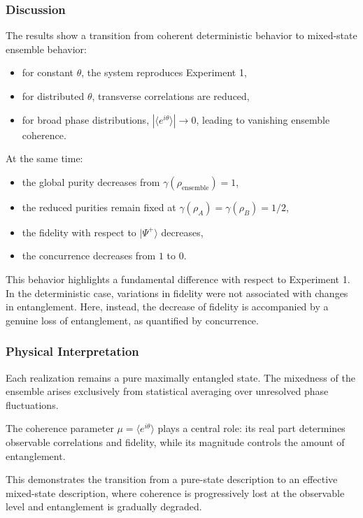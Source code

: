 \documentclass[a4paper]{article}
\begin{document}
\subsubsection{Discussion}

The results show a transition from coherent deterministic behavior to mixed-state ensemble behavior:
\begin{itemize}
    \item for constant \(\theta\), the system reproduces Experiment 1,
    \item for distributed \(\theta\), transverse correlations are reduced,
    \item for broad phase distributions, \( |\langle e^{i\theta}\rangle| \to 0 \), leading to vanishing ensemble coherence.
\end{itemize}

At the same time:
\begin{itemize}
    \item the global purity decreases from \(\gamma(\rho_{\mathrm{ensemble}})=1\),
    \item the reduced purities remain fixed at \(\gamma(\rho_A)=\gamma(\rho_B)=1/2\),
    \item the fidelity with respect to \( |\Psi^+\rangle \) decreases,
    \item the concurrence decreases from \(1\) to \(0\).
\end{itemize}

This behavior highlights a fundamental difference with respect to Experiment 1. In the deterministic case, variations in fidelity were not associated with changes in entanglement. Here, instead, the decrease of fidelity is accompanied by a genuine loss of entanglement, as quantified by concurrence.

\subsubsection{Physical Interpretation}

Each realization remains a pure maximally entangled state. The mixedness of the ensemble arises exclusively from statistical averaging over unresolved phase fluctuations.

The coherence parameter \(\mu = \langle e^{i\theta} \rangle\) plays a central role: its real part determines observable correlations and fidelity, while its magnitude controls the amount of entanglement.

This demonstrates the transition from a pure-state description to an effective mixed-state description, where coherence is progressively lost at the observable level and entanglement is gradually degraded.
\end{document}

